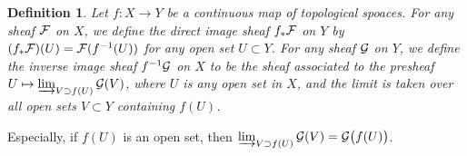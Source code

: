 \documentclass[8pt]{article}
\theoremstyle{plain}
\newtheorem{defi}{Definition}
\begin{document}
\begin{defi}
	Let $f:X\to Y$ be a continuous map of topological spoaces. For any sheaf $\mathcal{F}$ on $X$, we define the direct image sheaf $f_*\mathcal{F}$ on $Y$ by $(f_*\mathcal{F})(U)=\mathcal{F}(f^{-1}(U))$ for any open set $U\subset Y$. For any sheaf $\mathcal{G}$ on $Y$, we define the inverse image sheaf $f^{-1}\mathcal{G}$ on $X$ to be the sheaf associated to the presheaf $U\mapsto \varinjlim_{V \supset f(U)}\mathcal{G}(V)$, where $U$ is any open set in $X$, and the limit is taken over all open sets $V\subset Y$ containing $f(U)$. 
\end{defi}
Especially, if $f(U)$ is an open set, then $\varinjlim_{V \supset f(U)}\mathcal{G}(V)=\mathcal{G}\bigl(f(U)\bigr)$.
\end{document}
